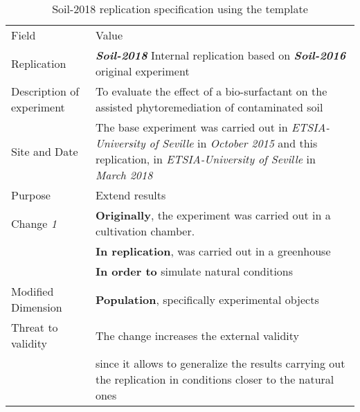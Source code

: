 
\begin{table*}[h]
  \caption{Soil-2018 replication specification using the template}
\label{tab:plantEng}
  \centering

\begin{tabularx}{\textwidth}{
  >{\hsize=0.25\hsize}X
  >{\hsize=0.8\hsize}X}
  
    \noalign{\smallskip}\hline\noalign{\smallskip}
  
  Field &  Value  \\ 
  \noalign{\smallskip}\hline\noalign{\smallskip}
 
 Replication &   \textbf{\emph{Soil-2018}}   Internal replication based on \textbf{\emph{Soil-2016}}  original experiment   \\
     
 Description \newline of experiment &  To evaluate the effect of a bio-surfactant on the assisted phytoremediation of contaminated soil \\  
 
 Site and Date & The base experiment was carried out in  \textit{ETSIA-University of Seville}  in  \textit{October 2015} and this replication, in  \textit{ETSIA-University of Seville} in \textit{March 2018}    \\
    Purpose  &  Extend results \\  
\hline   
    Change \textit{1}   & \textbf{Originally}, the experiment was carried out in a cultivation chamber. \\& \textbf{In replication}, was carried out in a greenhouse \\& \textbf{In order to} simulate natural conditions \\
    
    Modified Dimension & 
    \textbf{Population}, specifically experimental objects   \\   
    Threat to validity  & The change increases the external validity\\
    & since it allows to generalize the results carrying out the replication in conditions closer to the natural ones \\  \hline
  

\end{tabularx}
\end{table*}
